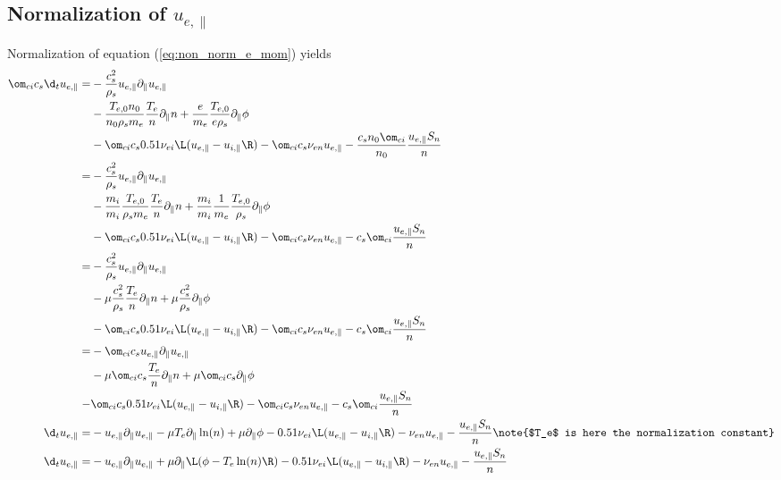 \subsection{Normalization of \texorpdfstring{$u_{e,\|}$
    }{parallel electron momentum}}
%
Normalization of equation (\ref{eq:non_norm_e_mom}) yields
%
\begin{align*}
 \om_{ci} c_s
 \d_t u_{e,\|}
 =&
 - \frac{c_s^2}{\rho_s}
  u_{e,\|} \partial_\| u_{e,\|}
 \\
 &
 - \frac{T_{e,0}n_0}{n_0\rho_s m_e}
 \frac{T_e}{n} \partial_\| n
 + \frac{e}{m_e}
 \frac{T_{e,0}}{e\rho_s} \partial_\|\phi
 \\
 &
 - \om_{ci} c_s
 0.51 \nu_{ei} \L(u_{e,\|}-u_{i,\|}\R)
 - \om_{ci} c_s
 \nu_{en} u_{e,\|}
 - \frac{c_s n_0 \om_{ci}}{n_0}
 \frac{u_{e,\|}S_{n}}{n}
 \\
%
%
 =&
 - \frac{c_s^2}{\rho_s}
 u_{e,\|} \partial_\| u_{e,\|}
 \\
 &
 - \frac{m_i}{m_i} \frac{T_{e,0}}{\rho_s m_e}
 \frac{T_e}{n} \partial_\| n
 + \frac{m_i}{m_i} \frac{1}{m_e} \frac{T_{e,0}}{\rho_s}
 \partial_\|\phi
 \\
 &
 - \om_{ci} c_s
 0.51 \nu_{ei} \L(u_{e,\|}-u_{i,\|}\R)
 - \om_{ci} c_s
 \nu_{en} u_{e,\|}
 - c_s \om_{ci}
 \frac{u_{e,\|}S_{n}}{n}
 \\
%
%
 =&
 - \frac{c_s^2}{\rho_s}
 u_{e,\|} \partial_\| u_{e,\|}
 \\
 &
 - \mu \frac{c_s^2}{\rho_s}
 \frac{T_e}{n} \partial_\| n
 + \mu \frac{c_s^2}{\rho_s}
 \partial_\|\phi
 \\
 &
 - \om_{ci} c_s
 0.51 \nu_{ei} \L(u_{e,\|}-u_{i,\|}\R)
 - \om_{ci} c_s
 \nu_{en} u_{e,\|}
 - c_s \om_{ci}
 \frac{u_{e,\|}S_{n}}{n}
 \\
%
%
 =&
 - \om_{ci} c_s
 u_{e,\|} \partial_\| u_{e,\|}
 \\
 &
 - \mu \om_{ci} c_s
 \frac{T_e}{n} \partial_\| n
 + \mu \om_{ci} c_s
 \partial_\|\phi
 \\
 -&
 \om_{ci} c_s
 0.51 \nu_{ei} \L(u_{e,\|}-u_{i,\|}\R)
 - \om_{ci} c_s
 \nu_{en} u_{e,\|}
 - c_s \om_{ci}
 \frac{u_{e,\|}S_{n}}{n}
 \\
%
%
 \d_t u_{e,\|}
 =&
 - u_{e,\|} \partial_\| u_{e,\|}
 - \mu T_e \partial_\| \ln(n)
 + \mu \partial_\|\phi
 - 0.51 \nu_{ei} \L(u_{e,\|}-u_{i,\|}\R)
 - \nu_{en} u_{e,\|}
 - \frac{u_{e,\|}S_{n}}{n}
 \note{$T_e$ is here the normalization constant}
 \\
%
%
 \d_t u_{e,\|}
 =&
 - u_{e,\|} \partial_\| u_{e,\|}
 + \mu \partial_\| \L(\phi - T_e  \ln(n)\R)
 - 0.51 \nu_{ei} \L(u_{e,\|}-u_{i,\|}\R)
 - \nu_{en} u_{e,\|}
 - \frac{u_{e,\|}S_{n}}{n}
\end{align*}
%

